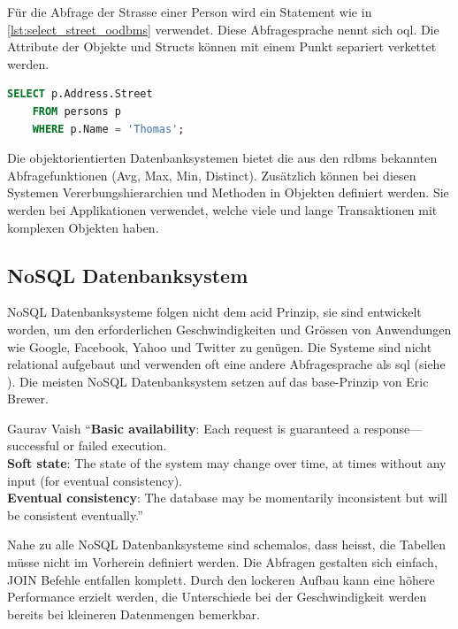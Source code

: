 Für die Abfrage der Strasse einer Person wird ein Statement wie in \autoref{lst:select_street_oodbms} verwendet. Diese Abfragesprache nennt
sich \gls{oql}. Die Attribute der Objekte und Structs können mit einem Punkt separiert verkettet werden.

\begin{lstlisting}[language=SQL, caption=Abfrage in objektorientierem Datenbanksystem, label=lst:select_street_oodbms]  
    SELECT p.Address.Street
    FROM persons p
    WHERE p.Name = 'Thomas';
\end{lstlisting}

Die objektorientierten Datenbanksystemen bietet die aus den \gls{rdbms} bekannten Abfragefunktionen (Avg, Max, Min, Distinct). 
Zusätzlich können bei diesen Systemen Vererbungshierarchien und Methoden in Objekten definiert werden. Sie werden bei Applikationen verwendet,
welche viele und lange Transaktionen mit komplexen Objekten haben.

\subsection{NoSQL Datenbanksystem}\label{no_sql_db}
NoSQL Datenbanksysteme folgen nicht dem \gls{acid} Prinzip, sie sind entwickelt worden, um den erforderlichen Geschwindigkeiten und Grössen von Anwendungen wie Google, 
Facebook, Yahoo und Twitter zu genügen. Die Systeme sind nicht relational aufgebaut und verwenden oft eine andere Abfragesprache als \gls{sql} (siehe \cite{vaish2013getting}). 
Die meisten NoSQL Datenbanksystem setzen auf das \gls{base}-Prinzip von Eric Brewer.

\begin{myQuote}{Gaurav Vaish \cite{vaish2013getting}}
"`\textbf{Basic availability}: Each request is guaranteed a response—successful or failed execution.\\
\textbf{Soft state}: The state of the system may change over time, at times without any input (for eventual consistency).\\
\textbf{Eventual consistency}: The database may be momentarily inconsistent but will be consistent eventually."'
\end{myQuote}

Nahe zu alle NoSQL Datenbanksysteme sind schemalos, dass heisst, die Tabellen müsse nicht im Vorherein definiert werden. Die Abfragen gestalten sich einfach, JOIN Befehle entfallen 
komplett. Durch den lockeren Aufbau kann eine höhere Performance erzielt werden, die Unterschiede bei der Geschwindigkeit werden bereits bei kleineren Datenmengen bemerkbar.

